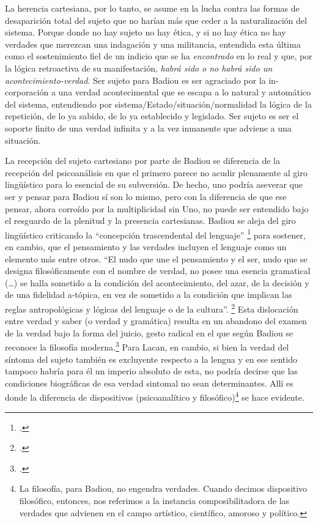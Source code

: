 La herencia cartesiana, por lo tanto, se asume en la lucha contra las formas de desaparición total del sujeto que no harían más que ceder a la naturalización del sistema. Porque donde no hay sujeto no hay ética, y si no hay ética no hay verdades que merezcan una indagación y una militancia, entendida esta última como el sostenimiento fiel de un indicio que se ha \emph{encontrado} en lo real y que, por la lógica retroactiva de su manifestación, \emph{habrá sido o no habrá sido un acontecimiento-verdad}. Ser sujeto para Badiou es ser agraciado por la in-corporación a una verdad acontecimental que se escapa a lo natural y automático del sistema, entendiendo por sistema/Estado/situación/normalidad la lógica de la repetición, de lo ya sabido, de lo ya establecido y legislado. Ser sujeto es ser el soporte finito de una verdad infinita y a la vez inmanente que adviene a una situación.

La recepción del sujeto cartesiano por parte de Badiou se diferencia de la recepción del psicoanálisis en que el primero parece no acudir plenamente al giro lingüístico para lo esencial de su subversión. De hecho, uno podría aseverar que ser y pensar para Badiou sí son lo mismo, pero con la diferencia de que ese pensar, ahora corroído por la multiplicidad sin Uno, no puede ser entendido bajo el resguardo de la plenitud y la presencia cartesianas. Badiou se aleja del giro lingüístico criticando la \enquote{concepción trascendental del lenguaje} \footcite[][103]{@7137-BADIOU2002} para sostener, en cambio, que el pensamiento y las verdades incluyen el lenguaje como un elemento más entre otros. \enquote{El nudo que une el pensamiento y el ser, nudo que se designa filosóficamente con el nombre de verdad, no posee una esencia gramatical (\ldots) se halla sometido a la condición del acontecimiento, del azar, de la decisión y de una fidelidad a-tópica, en vez de sometido a la condición que implican las reglas antropológicas y lógicas del lenguaje o de la cultura}. \footcite[][103-104]{@7137-BADIOU2002} Esta dislocación entre verdad y saber (o verdad y gramática) resulta en un abandono del examen de la verdad bajo la forma del juicio, gesto radical en el que según Badiou se reconoce la filosofía moderna.\footcite[][54]{@7137-BADIOU2002} Para Lacan, en cambio, si bien la verdad del síntoma del sujeto también es excluyente respecto a la lengua y en ese sentido tampoco habría para él un imperio absoluto de esta, no podría decirse que las condiciones biográficas de esa verdad sintomal no sean determinantes. Allí es donde la diferencia de dispositivos (psicoanalítico y filosófico)\footnote{La filosofía, para Badiou, no engendra verdades. Cuando decimos dispositivo filosófico, entonces, nos referimos a la instancia composibilitadora de las verdades que advienen en el campo artístico, científico, amoroso y político.} se hace evidente.

